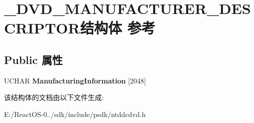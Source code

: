 \hypertarget{struct___d_v_d___m_a_n_u_f_a_c_t_u_r_e_r___d_e_s_c_r_i_p_t_o_r}{}\section{\+\_\+\+D\+V\+D\+\_\+\+M\+A\+N\+U\+F\+A\+C\+T\+U\+R\+E\+R\+\_\+\+D\+E\+S\+C\+R\+I\+P\+T\+O\+R结构体 参考}
\label{struct___d_v_d___m_a_n_u_f_a_c_t_u_r_e_r___d_e_s_c_r_i_p_t_o_r}
\subsection*{Public 属性}
\begin{DoxyCompactItemize}
\item 
\mbox{\label{struct___d_v_d___m_a_n_u_f_a_c_t_u_r_e_r___d_e_s_c_r_i_p_t_o_r_a6a5467b6498148efcb1821530e5fb308}} 
U\+C\+H\+AR {\bfseries Manufacturing\+Information} \mbox{[}2048\mbox{]}
\end{DoxyCompactItemize}


该结构体的文档由以下文件生成\+:\begin{DoxyCompactItemize}
\item 
E\+:/\+React\+O\+S-\/0../sdk/include/psdk/ntddcdvd.\+h\end{DoxyCompactItemize}
